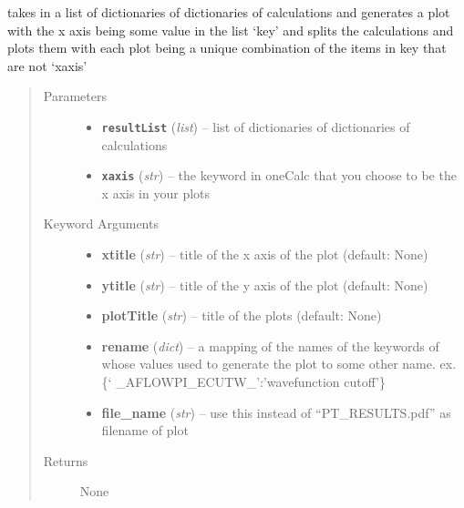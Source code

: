 \documentclass[letterpaper,10pt,english]{sphinxmanual}
\begin{document}
\begin{fulllineitems}
\label{pseudo:pseudo.plot}
takes in a list of dictionaries of dictionaries of calculations and generates
a plot with the x axis being some value in the list `key' and splits the calculations
and plots them with each plot being a unique combination of the items in key that are not
`xaxis'
\begin{quote}\begin{description}
\item[{Parameters}] \leavevmode\begin{itemize}
\item {} 
\textbf{\texttt{resultList}} (\emph{list}) -- list of dictionaries of dictionaries of calculations

\item {} 
\textbf{\texttt{xaxis}} (\emph{str}) -- the keyword in oneCalc that you choose to be the x axis in your plots

\end{itemize}

\item[{Keyword Arguments}] \leavevmode\begin{itemize}
\item {} 
\textbf{xtitle} (\emph{str}) --
title of the x axis of the plot (default: None)

\item {} 
\textbf{ytitle} (\emph{str}) --
title of the y axis of the plot (default: None)

\item {} 
\textbf{plotTitle} (\emph{str}) --
title of the plots (default: None)

\item {} 
\textbf{rename} (\emph{dict}) --
a mapping of the names of the keywords of whose
values used to generate the plot to some other name.
ex. \{` \_AFLOWPI\_ECUTW\_':'wavefunction cutoff'\}

\item {} 
\textbf{file\_name} (\emph{str}) --
use this instead of ``PT\_RESULTS.pdf'' as filename of plot

\end{itemize}

\item[{Returns}] \leavevmode
None

\end{description}\end{quote}

\end{fulllineitems}
\end{document}
